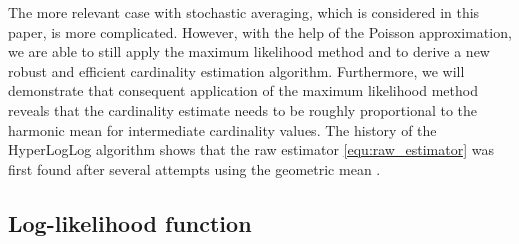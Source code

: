 \documentclass[a4paper]{scrartcl}
\begin{document}
The more relevant case with stochastic averaging, which is considered in this paper, is more complicated. However, with the help of the Poisson approximation, we are able to still apply the maximum likelihood method and to derive a new robust and efficient cardinality estimation algorithm. Furthermore, we will demonstrate that consequent application of the maximum likelihood method reveals that the cardinality estimate needs to be roughly proportional to the harmonic mean for intermediate cardinality values. The history of the HyperLogLog algorithm shows that the raw estimator \eqref{equ:raw_estimator} was first found after several attempts using the geometric mean \cite{Flajolet2007, Durand2003}.

\subsection{Log-likelihood function}
\end{document}
